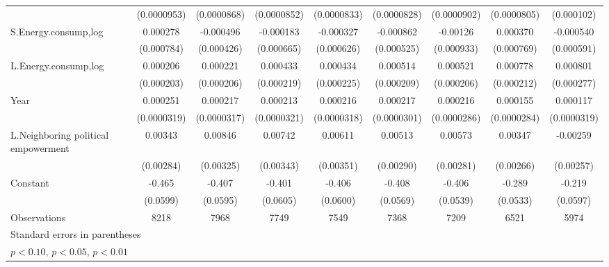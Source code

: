 \begin{table}[htbp]
\begin{tabular}{l*{8}{c}}
                    & (0.0000953)         & (0.0000868)         & (0.0000852)         & (0.0000833)         & (0.0000828)         & (0.0000902)         & (0.0000805)         &  (0.000102)         \\
[1em]
S.Energy.consump,log&    0.000278         &   -0.000496         &   -0.000183         &   -0.000327         &   -0.000862         &    -0.00126         &    0.000370         &   -0.000540         \\
                    &  (0.000784)         &  (0.000426)         &  (0.000665)         &  (0.000626)         &  (0.000525)         &  (0.000933)         &  (0.000769)         &  (0.000591)         \\
[1em]
L.Energy.consump,log&    0.000206         &    0.000221         &    0.000433\sym{**} &    0.000434\sym{*}  &    0.000514\sym{**} &    0.000521\sym{**} &    0.000778\sym{***}&    0.000801\sym{***}\\
                    &  (0.000203)         &  (0.000206)         &  (0.000219)         &  (0.000225)         &  (0.000209)         &  (0.000206)         &  (0.000212)         &  (0.000277)         \\
[1em]
Year                &    0.000251\sym{***}&    0.000217\sym{***}&    0.000213\sym{***}&    0.000216\sym{***}&    0.000217\sym{***}&    0.000216\sym{***}&    0.000155\sym{***}&    0.000117\sym{***}\\
                    & (0.0000319)         & (0.0000317)         & (0.0000321)         & (0.0000318)         & (0.0000301)         & (0.0000286)         & (0.0000284)         & (0.0000319)         \\
[1em]
L.Neighboring political empowerment&     0.00343         &     0.00846\sym{**} &     0.00742\sym{**} &     0.00611\sym{*}  &     0.00513\sym{*}  &     0.00573\sym{**} &     0.00347         &    -0.00259         \\
                    &   (0.00284)         &   (0.00325)         &   (0.00343)         &   (0.00351)         &   (0.00290)         &   (0.00281)         &   (0.00266)         &   (0.00257)         \\
[1em]
Constant            &      -0.465\sym{***}&      -0.407\sym{***}&      -0.401\sym{***}&      -0.406\sym{***}&      -0.408\sym{***}&      -0.406\sym{***}&      -0.289\sym{***}&      -0.219\sym{***}\\
                    &    (0.0599)         &    (0.0595)         &    (0.0605)         &    (0.0600)         &    (0.0569)         &    (0.0539)         &    (0.0533)         &    (0.0597)         \\
\hline
Observations        &        8218         &        7968         &        7749         &        7549         &        7368         &        7209         &        6521         &        5974         \\
\hline\hline
\multicolumn{9}{l}{\footnotesize Standard errors in parentheses}\\
\multicolumn{9}{l}{\footnotesize \sym{*} \(p<0.10\), \sym{**} \(p<0.05\), \sym{***} \(p<0.01\)}\\
\end{tabular}
\end{table}
